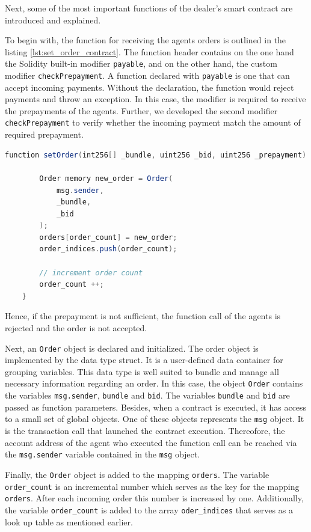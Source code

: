 Next, some of the most important functions of the dealer's smart contract are introduced and explained.

To begin with, the function for receiving the agents orders is outlined in the listing \ref{lst:set_order_contract}.
The function header contains on the one hand the Solidity built-in modifier \verb|payable|, and on the other hand, the custom
modifier \verb|checkPrepayment|. A function declared with \verb|payable| is one that can accept incoming payments. 
Without the declaration, the function would reject payments and throw an exception. In this case, the modifier is required 
to receive the prepayments of the agents. 
Further, we developed the second modifier \verb|checkPrepayment| to verify whether the incoming payment match the amount
of required prepayment.

\begin{lstlisting}[float=htbp, label=lst:set_order_contract, caption=Receiving agents orders, language=Java]
    function setOrder(int256[] _bundle, uint256 _bid, uint256 _prepayment) public payable checkPrepayment(_prepayment) {

        Order memory new_order = Order(
            msg.sender,
            _bundle,
            _bid
        );
        orders[order_count] = new_order;
        order_indices.push(order_count);

        // increment order count
        order_count ++;
    }
\end{lstlisting}

Hence, if the prepayment is not sufficient, the function call of the agents is rejected and 
the order is not accepted.

Next, an \verb|Order| object is declared and initialized. The order object is implemented by the data type
struct. It is a user-defined data container for grouping variables.
This data type is well suited to bundle and manage all necessary information regarding an order.
In this case, the object \verb|Order| contains the variables \verb|msg.sender|, \verb|bundle| and \verb|bid|.
The variables \verb|bundle| and \verb|bid| are passed as function parameters.
Besides, when a contract is executed, it has access to a small set of global objects. 
One of these objects represents the \verb|msg| object. It is the transaction call that launched the contract execution.
Thereofore, the account address of the agent who executed the function call can be reached via the \verb|msg.sender| variable
contained in the \verb|msg| object.

Finally, the \verb|Order| object is added to the mapping \verb|orders|.
The variable \verb|order_count| is an incremental number which serves as the key for 
the mapping \verb|orders|. After each incoming order this number is increased by one. 
Additionally, the variable \verb|order_count| is added to the array \verb|oder_indices|
that serves as a look up table as mentioned earlier.

